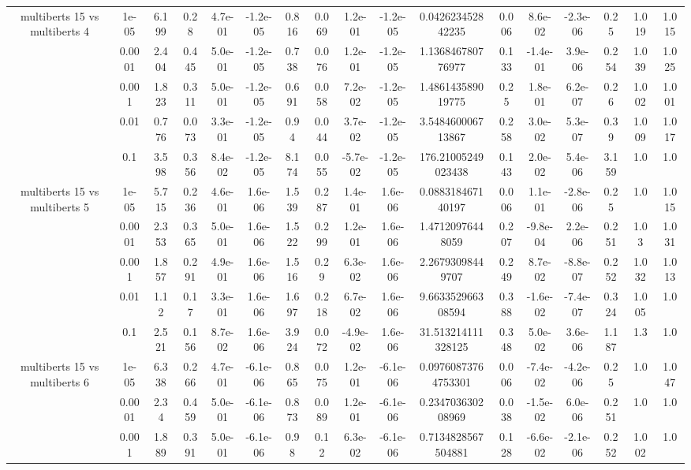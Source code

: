\begin{tabular}{|c|c|c|c|c|c|c|c|c|c|c|c|c|c|c|c|c|}
\hline
\multirow{5}{*}{multiberts 15 vs multiberts 4} & 1e-05 & 6.199 & 0.28 & 4.7e-01 & -1.2e-05 & 0.816 & 0.069 & 1.2e-01 & -1.2e-05 & 0.042623452842235 & 0.006 & 8.6e-02 & -2.3e-06 & 0.25 & 1.019 & 1.015 \\
 & 0.0001 & 2.404 & 0.445 & 5.0e-01 & -1.2e-05 & 0.738 & 0.076 & 1.2e-01 & -1.2e-05 & 1.136846780776977 & 0.133 & -1.4e-01 & 3.9e-06 & 0.254 & 1.039 & 1.025 \\
 & 0.001 & 1.823 & 0.311 & 5.0e-01 & -1.2e-05 & 0.691 & 0.058 & 7.2e-02 & -1.2e-05 & 1.486143589019775 & 0.25 & 1.8e-01 & 6.2e-07 & 0.26 & 1.002 & 1.001 \\
 & 0.01 & 0.776 & 0.073 & 3.3e-01 & -1.2e-05 & 0.94 & 0.044 & 3.7e-02 & -1.2e-05 & 3.548460006713867 & 0.258 & 3.0e-02 & 5.3e-07 & 0.39 & 1.009 & 1.017 \\
 & 0.1 & 3.598 & 0.356 & 8.4e-02 & -1.2e-05 & 8.174 & 0.055 & -5.7e-02 & -1.2e-05 & 176.21005249023438 & 0.143 & 2.0e-02 & 5.4e-06 & 3.159 & 1.0 & 1.0 \\
\hline
\multirow{5}{*}{multiberts 15 vs multiberts 5} & 1e-05 & 5.715 & 0.236 & 4.6e-01 & 1.6e-06 & 1.539 & 0.287 & 1.4e-01 & 1.6e-06 & 0.088318467140197 & 0.006 & 1.1e-01 & -2.8e-06 & 0.25 & 1.0 & 1.015 \\
 & 0.0001 & 2.353 & 0.365 & 5.0e-01 & 1.6e-06 & 1.522 & 0.299 & 1.2e-01 & 1.6e-06 & 1.47120976448059 & 0.207 & -9.8e-04 & 2.2e-06 & 0.251 & 1.03 & 1.031 \\
 & 0.001 & 1.857 & 0.291 & 4.9e-01 & 1.6e-06 & 1.516 & 0.29 & 6.3e-02 & 1.6e-06 & 2.26793098449707 & 0.249 & 8.7e-02 & -8.8e-07 & 0.252 & 1.032 & 1.013 \\
 & 0.01 & 1.12 & 0.17 & 3.3e-01 & 1.6e-06 & 1.697 & 0.218 & 6.7e-02 & 1.6e-06 & 9.663352966308594 & 0.388 & -1.6e-02 & -7.4e-07 & 0.324 & 1.005 & 1.0 \\
 & 0.1 & 2.521 & 0.156 & 8.7e-02 & 1.6e-06 & 3.924 & 0.072 & -4.9e-02 & 1.6e-06 & 31.513214111328125 & 0.348 & 5.0e-02 & 3.6e-06 & 1.187 & 1.3 & 1.0 \\
\hline
\multirow{5}{*}{multiberts 15 vs multiberts 6} & 1e-05 & 6.338 & 0.266 & 4.7e-01 & -6.1e-06 & 0.865 & 0.075 & 1.2e-01 & -6.1e-06 & 0.09760873764753301 & 0.006 & -7.4e-02 & -4.2e-06 & 0.25 & 1.0 & 1.047 \\
 & 0.0001 & 2.34 & 0.459 & 5.0e-01 & -6.1e-06 & 0.873 & 0.089 & 1.2e-01 & -6.1e-06 & 0.234703630208969 & 0.038 & -1.5e-02 & 6.0e-06 & 0.251 & 1.0 & 1.0 \\
 & 0.001 & 1.889 & 0.391 & 5.0e-01 & -6.1e-06 & 0.98 & 0.12 & 6.3e-02 & -6.1e-06 & 0.7134828567504881 & 0.128 & -6.6e-02 & -2.1e-06 & 0.252 & 1.002 & 1.0 \\

\end{tabular}
